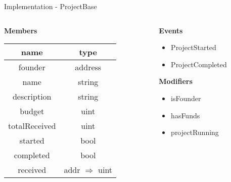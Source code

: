 \documentclass{beamer}
\begin{document}
\begin{frame}{Implementation - ProjectBase}
\begin{columns}
\begin{column}{0.55\textwidth}
\begin{center}
\textbf{Members}\\
\vspace{3mm}
	\begin{tabular}{c|c}
		name & type \\
		\hline
		 founder & address \\
		 name & string \\
		 description & string \\
		 budget & uint \\
		 totalReceived & uint \\
		 started & bool \\
		 completed & bool \\
		 received & addr $\Rightarrow$ uint \\
	\end{tabular}
\end{center}
\end{column}
\begin{column}{0.45\textwidth}
\begin{center}
\textbf{Events}\\
\vspace{1mm}
\begin{itemize}
	\item ProjectStarted
	\item ProjectCompleted
\end{itemize}
\vspace{8mm}
\textbf{Modifiers}\\
\vspace{1mm}
\begin{itemize}
	\item isFounder
	\item hasFunds
	\item projectRunning
\end{itemize}
\end{center}
\end{column}
\end{columns}
\end{frame}
\end{document}
